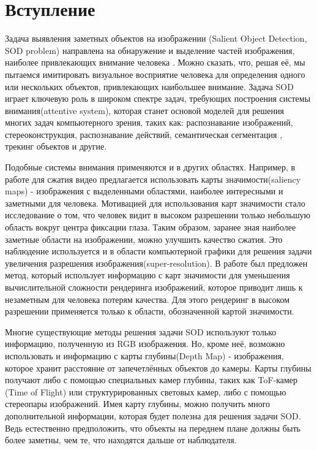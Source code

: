 \section{Вступление}

Задача выявления заметных объектов на изображении (Salient Object Detection, SOD problem) направлена на
обнаружение и выделение частей изображения, наиболее привлекающих внимание
человека \cite{Is-Depth-Really-Necessary-for-SOD}. Можно сказать, что, решая её, мы пытаемся имитировать визуальное восприятие человека для определения одного
или нескольких объектов, привлекающих наибольшее внимание. Задача SOD играет ключевую роль в широком спектре задач, требующих построения
системы внимания(attentive system)\cite{Attentive-Systems}, которая станет основой моделей для решения многих задач
компьютерного зрения, таких как: распознавание изображений\cite{Image-Understanding}, стереоконструкция\cite{Stereo-Matching},
распознавание действий\cite{Action-Recognition}, семантическая сегментация \cite{Semantic-Segmentation-1} \cite{Semantic-Segmentation-2},
трекинг объектов\cite{Pattern-Recognition} и другие.

Подобные системы внимания применяются и в других областях. Например, в работе \cite{Video-Compression}  для сжатия видео предлагается
использовать карты значимости(saliency maps) - изображения с выделенными областями, наиболее интересными и заметными для человека.
Мотивацией для использования карт значимости стало исследование о том, что человек видит в высоком разрешении только небольшую область вокруг центра фиксации глаза. Таким образом, заранее зная
наиболее заметные области на изображении, можно улучшить качество сжатия. Это наблюдение используется и в области компьютерной графики для решения задачи увеличения разрешения изображения(super-resolution).
В работе \cite{Rendering} был предложен метод, который использует информацию с карт значимости для уменьшения вычислительной сложности рендеринга изображений,
которое приводит лишь к незаметным для человека потерям качества. Для этого рендеринг в высоком разрешении применяется только к области, обозначенной картой значимости.

Многие существующие методы решения задачи SOD используют только информацию, полученную из RGB изображения.
Но, кроме неё, возможно использовать и информацию с карты глубины(Depth Map) - изображения, которое хранит расстояние от запечетлённых объектов до камеры.
Карты глубины получают либо с помощью специальных камер глубины, таких как ToF-камер (Time of Flight) или структурированных световых камер, либо с помощью
стереопары изображений. Имея карту глубины, можно получить много дополнительной информации, которая будет полезна для решения задачи SOD. Ведь естественно предположить,
что объекты на переднем плане должны быть более заметны, чем те, что находятся дальше от наблюдателя.

